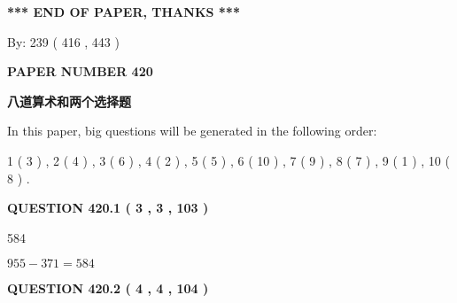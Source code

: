 \documentclass{ctexart}
\begin{document}
   
   
\vspace{1.0in} 
{\textbf{\large{ *** END OF PAPER, THANKS *** }}} 
   
   
\hspace{1.0in} By: 
 239 ( 416 ,  443 )
   
   
   
   
\newpage 
\setcounter{page}{ 
   420001 } 
   
   
   
   
 {\textbf{ \Large{ PAPER NUMBER  420  }}}
   
   
\vspace{0.2in}
   
   
   
   
   
   
 \vspace{0.2in}
{\LARGE {\textbf{ 八道算术和两个选择题}}}
   
   
   
\vspace{0.2in}
   
In this paper, big questions will be generated in the following order: 
   
   
   1 ( 3 )
 ,
   2 ( 4 )
 ,
   3 ( 6 )
 ,
   4 ( 2 )
 ,
   5 ( 5 )
 ,
   6 ( 10 )
 ,
   7 ( 9 )
 ,
   8 ( 7 )
 ,
   9 ( 1 )
 ,
   10 ( 8 )
 .
  
\vspace{0.2in}
  
{\textbf{\Large{QUESTION
420.1 
 ( 3 , 3 , 103 )
}}}
  
  
 
 
\noindent{}

584
 
 
 
 
\noindent{}

$ %
955 -  %
371=   %
584$
 
 
  
\vspace{0.2in}
  
{\textbf{\Large{QUESTION
420.2 
 ( 4 , 4 , 104 )
}}}
  
  
 
 
\noindent{}
\end{document}
